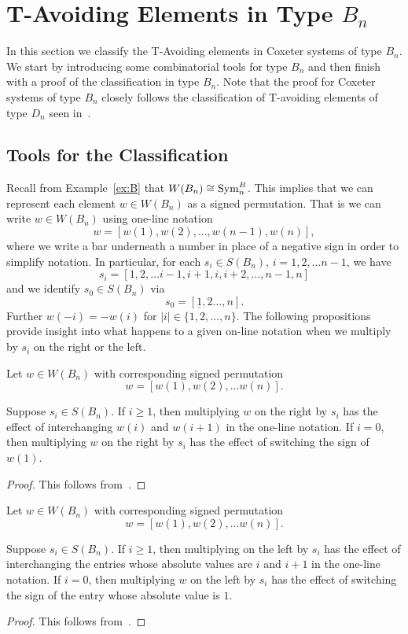 \chapter{T-Avoiding Elements in Type $B_n$}\label{chap:BnandCn}

In this section we classify the T-Avoiding elements in Coxeter systems of type $B_n$. We start by introducing some combinatorial tools for type $B_n$ and then finish with a proof of the classification in type $B_n$. Note that the proof for Coxeter systems of type $B_n$ closely follows the classification of T-avoiding elements of type $D_n$ seen in~\cite{Gern2013a}.

\section{Tools for the Classification}

Recall from Example~\ref{ex:B} that $W(B_n) \cong \mathrm{Sym}_n^B$. This implies that we can represent each element $w \in W(B_n)$ as a signed permutation. That is we can write $w \in W(B_n)$ using one-line notation 
\[ w=[w(1),w(2), \ldots, w(n-1), w(n)], \]
where we write a bar underneath a number in place of a negative sign in order to simplify notation. In particular, for each $s_i \in S(B_n)$, $i=1,2,\ldots n-1$, we have
\[s_i=[1,2, \ldots i-1, i+1,i,i+2, \ldots, n-1,n] \] and we identify $s_0 \in S(B_n)$ via
\[s_0=[\underline{1}, 2 \ldots, n].\] Further $w(-i)=-w(i)$ for $|i| \in \{1,2, \ldots, n\}$. The following propositions provide insight into what happens to a given on-line notation when we multiply by $s_i$ on the right or the left.

\begin{proposition}
	Let $w \in W(B_n)$ with corresponding signed permutation 
	\[w=[w(1),w(2), \ldots w(n)].\]
	
	Suppose $s_i \in S(B_n)$. If $i \geq 1$, then multiplying $w$ on the right by $s_i$ has the effect of interchanging $w(i)$ and $w(i+1)$ in  the one-line notation. If $i=0$, then multiplying $w$ on the right by $s_i$ has the effect of switching the sign of $w(1)$. 	
	\begin{proof}
	This follows from~\cite[Section 8.1 and A3.1]{Bjorner2005}.	
	\end{proof}
\end{proposition}

\begin{proposition}
Let $w \in W(B_n)$ with corresponding signed permutation 
	\[w=[w(1),w(2), \ldots w(n)].\]
	
	Suppose $s_i \in S(B_n)$. If $i \geq 1$, then multiplying on the left by $s_i$ has the effect of interchanging the entries whose absolute values are $i$ and $i+1$ in the one-line notation. If $i=0$, then multiplying $w$ on the left by $s_i$ has the effect of switching the sign of the entry whose absolute value is $1$.
	\begin{proof}
	This follows from~\cite[Section 8.1 and A3.1]{Bjorner2005}.	
	\end{proof}
\end{proposition}

